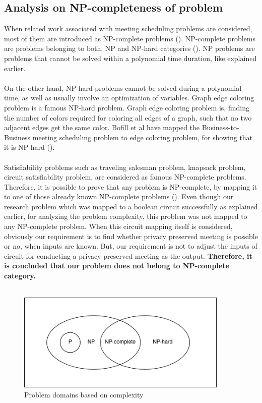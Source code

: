 \subsection{Analysis on NP-completeness of problem}
When related work associated with meeting scheduling problems are considered, most of them are introduced as NP-complete problems (\cite{bofill2022}). NP-complete problems are problems belonging to both, NP and NP-hard categories (\cite{britannica_np}). NP problems are problems that cannot be solved within a polynomial time duration, like explained earlier.\\ \\ 
On the other hand, NP-hard problems cannot be solved during a polynomial time, as well as usually involve an optimization of variables. Graph edge coloring problem is a famous NP-hard problem. Graph edge coloring problem is, finding the number of colors required for coloring all edges of a graph, such that no two adjacent edges get the same color. Bofill et al have mapped the Business-to-Business meeting scheduling problem to edge coloring problem, for showing that it is NP-hard (\cite{bofill2022}).\\ \\
Satisfiability problems such as traveling salesman problem, knapsack problem, circuit satisfiability problem, are considered as famous NP-complete problems. Therefore, it is possible to prove that any problem is NP-complete, by mapping it to one of those already known NP-complete problems (\cite{britannica_np}). Even though our research problem which was mapped to a boolean circuit successfully as explained earlier, for analyzing the problem complexity, this problem was not mapped to any NP-complete problem. When this circuit mapping itself is considered, obviously our requirement is to find whether privacy preserved meeting is possible or no, when inputs are known. But, our requirement is not to adjust the inputs of circuit for conducting a privacy preserved meeting as the output. \textbf{Therefore, it is concluded that our problem does not belong to NP-complete category.}\\ \\
\begin{figure}[H]
    \centering
    \includegraphics[width=0.9\textwidth]{./image/np_p_problems.png}
    \caption{Problem domains based on complexity}
    \label{fig:problem domains based on complexity}
\end{figure}
